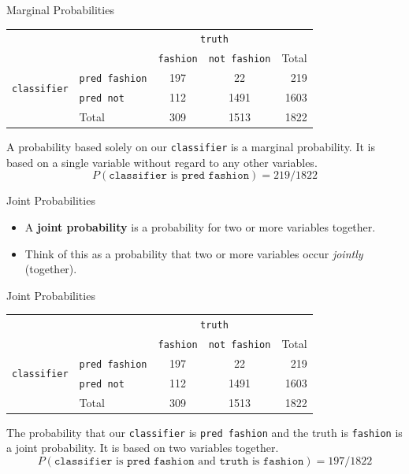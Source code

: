 \begin{frame}{Marginal Probabilities}
    \begin{center}
        \begin{tabular}{r l cc r}
		& & \multicolumn{2}{c}{{\texttt{truth}}} & \\
        \cline{3-4}
		& & \texttt{fashion} & \texttt{not fashion} & Total  \\ 
        \cline{2-5}
        \multirow{2}{*}{{\texttt{classifier}}} 
        & \texttt{pred fashion}   & 197 & 22 & 219 \\ 
  		& \texttt{pred not}       & 112 & 1491 & 1603 \\ 
        \cline{2-5}
  		& Total	& 309 & 1513 & 1822 \\
        \cline{2-5}
    \end{tabular}
    \end{center}
    \vspace{10pt}A probability based solely on our \texttt{classifier} is a marginal probability. It is based on a single variable without regard to any other variables. 
    \[
    P(\texttt{classifier} \text{ is } \texttt{pred fashion}) = 219/1822
    \]
\end{frame}

\begin{frame}{Joint Probabilities}
    \begin{itemize}
        \item A \textbf{joint probability} is a probability for two or more variables together.
        \item Think of this as a probability that two or more variables occur \textit{jointly} (together). 
    \end{itemize}
\end{frame}

\begin{frame}{Joint Probabilities}
    \begin{center}
        \begin{tabular}{r l cc r}
		& & \multicolumn{2}{c}{{\texttt{truth}}} & \\
        \cline{3-4}
		& & \texttt{fashion} & \texttt{not fashion} & Total  \\ 
        \cline{2-5}
        \multirow{2}{*}{{\texttt{classifier}}} 
        & \texttt{pred fashion}   & 197 & 22 & 219 \\ 
  		& \texttt{pred not}       & 112 & 1491 & 1603 \\ 
        \cline{2-5}
  		& Total	& 309 & 1513 & 1822 \\
        \cline{2-5}
    \end{tabular}
    \end{center}
    \vspace{10pt}The probability that our \texttt{classifier} is \texttt{pred fashion} and the truth is \texttt{fashion} is a joint probability. It is based on two variables together. 
    \[
    P(\texttt{classifier} \text{ is } \texttt{pred fashion} \text { and } \texttt{truth} \text{ is } \texttt{fashion}) = 197/1822
    \]
\end{frame}

